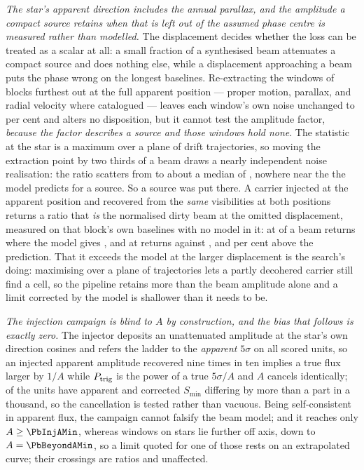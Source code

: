 \emph{The star's apparent direction includes the annual parallax, and the
amplitude a compact source retains when that is left out of the assumed phase
centre is measured rather than modelled.} The displacement decides whether the
loss can be treated as a scalar at all: a small fraction of a synthesised beam
attenuates a compact source and does nothing else, while a displacement
approaching a beam puts the phase wrong on the longest baselines. Re-extracting
the \SensNReextWin{} windows of \SensNReextBlock{} blocks furthest out at the
full apparent position --- proper motion, parallax, and radial velocity where
catalogued --- leaves each window's own noise unchanged to
\SensReextNoiseMaxPct{} per cent and alters no disposition, but it cannot test
the amplitude factor, \emph{because the factor describes a source and those
windows hold none}. The statistic at the star is a maximum over a plane of
drift trajectories, so moving the extraction point by two thirds of a beam
draws a nearly independent noise realisation: the ratio scatters from
\SensReTstarLo{} to \SensReTstarHi{} about a median of \SensReTstarMed,
nowhere near the \SensPxLargePred{} the model predicts for a source. So a
source was put there. A carrier injected at the apparent position and
recovered from the \emph{same} visibilities at both positions returns a ratio
that \emph{is} the normalised dirty beam at the omitted displacement,
measured on that block's own baselines with no model in it: at
\SensPxSmallBeams{} of a beam \SensPxSmallStar{} returns
\SensPxSmallMeas{} where the model gives \SensPxSmallPred, and at
\SensPxLargeBeams{} \SensPxLargeStar{} returns \SensPxLargeMeas{} against
\SensPxLargePred, \SensPxSmallRatioPct{} and \SensPxLargeRatioPct{} per cent
above the prediction. That it exceeds the model at the larger displacement is
the search's doing: maximising over a plane of trajectories lets a partly
decohered carrier still find a cell, so the pipeline retains more than the
beam amplitude alone and a limit corrected by the model is shallower than it
needs to be.

\emph{The injection campaign is blind to $A$ by construction, and the bias
that follows is exactly zero.} The injector deposits an unattenuated amplitude
at the star's own direction cosines and refers the ladder to the
\emph{apparent} $5\sigma$ on all \PbInjNUnit{} scored units, so an injected
apparent amplitude recovered nine times in ten implies a true flux larger by
$1/A$ while $P_{\rm trig}$ is the power of a true $5\sigma/A$ and $A$ cancels
identically; \PbInjNDistinct{} of the units have apparent and corrected
$S_{\min}$ differing by more than a part in a thousand, so the cancellation
is tested rather than vacuous. Being self-consistent in apparent flux, the
campaign cannot falsify the beam model; and it reaches only
$A\ge\PbInjAMin$, whereas \PbNBeyond{} windows on \PbNBeyondStar{} stars lie
further off axis, down to $A=\PbBeyondAMin$, so a limit quoted for one of
those rests on an extrapolated curve; their \PbNBeyondCross{} crossings are
ratios and unaffected.


